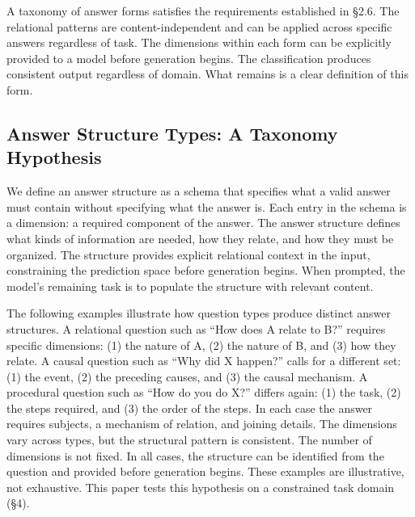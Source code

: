 \documentclass{article}
\begin{document}
A taxonomy of answer forms satisfies the requirements established in \S2.6. The relational patterns are content-independent and can be applied across specific answers regardless of task. The dimensions within each form can be explicitly provided to a model before generation begins. The classification produces consistent output regardless of domain. What remains is a clear definition of this form.

\subsection{Answer Structure Types: A Taxonomy Hypothesis}

We define an answer structure as a schema that specifies what a valid answer must contain without specifying what the answer is. Each entry in the schema is a dimension: a required component of the answer. The answer structure defines what kinds of information are needed, how they relate, and how they must be organized. The structure provides explicit relational context in the input, constraining the prediction space before generation begins. When prompted, the model's remaining task is to populate the structure with relevant content.

The following examples illustrate how question types produce distinct answer structures. A relational question such as ``How does A relate to B?'' requires specific dimensions: (1) the nature of A, (2) the nature of B, and (3) how they relate. A causal question such as ``Why did X happen?'' calls for a different set: (1) the event, (2) the preceding causes, and (3) the causal mechanism. A procedural question such as ``How do you do X?'' differs again: (1) the task, (2) the steps required, and (3) the order of the steps. In each case the answer requires subjects, a mechanism of relation, and joining details. The dimensions vary across types, but the structural pattern is consistent. The number of dimensions is not fixed. In all cases, the structure can be identified from the question and provided before generation begins. These examples are illustrative, not exhaustive. This paper tests this hypothesis on a constrained task domain (\S4).
\end{document}
